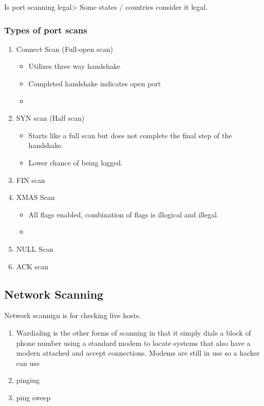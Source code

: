 Is port scanning legal> Some states / countries consider it legal.

\subsubsection{Types of port scans}
\begin{enumerate}
    \item Connect Scan (Full-open scan)
    \begin{itemize}
        \item Utilizes three way handshake
        \item Completed handshake indicates open port
        \item 
    \end{itemize}
    \item SYN scan (Half scan)
    \begin{itemize}
        \item Starts like a full scan but does not complete the final step of the handshake.
        \item Lower chance of being logged.
    \end{itemize}
    \item FIN scan
    \item XMAS Scan
    \begin{itemize}
        \item All flags enabled, combination of flags is illogical and illegal.
        \item 
    \end{itemize}
    \item NULL Scan
    \item ACK scan
\end{enumerate}

\subsection{Network Scanning}
Network scannign is for checking live hosts.
\begin{enumerate}
    \item Wardialing is the other forms of scanning in that it simply dials a block of phone number using a standard modem to locate systems that also have a modern attached and accept connections.
    Modems are still in use so a hacker can use
    \item pinging
    \item ping sweep
\end{enumerate}

